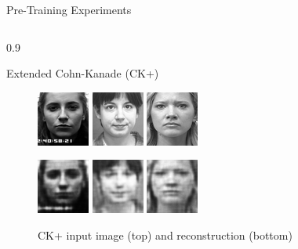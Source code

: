 \documentclass[final]{beamer}
\newlength{\onecolwid}
\newlength{\threecolwid}
\begin{document}
\begin{frame}[t]
\begin{columns}[t]
\begin{column}{\threecolwid}
\begin{alertblock}{Pre-Training Experiments}
\begin{columns}[t, totalwidth=0.9\threecolwid]
\begin{column}{0.9\onecolwid}
\begin{block}{Extended Cohn-Kanade (CK+)}
	\begin{figure}
	\centering
	\includegraphics[width=0.2\linewidth]{graphics/reconstructions/ckplus/input_00.png}
	\includegraphics[width=0.2\linewidth]{graphics/reconstructions/ckplus/input_01.png}
	\includegraphics[width=0.2\linewidth]{graphics/reconstructions/ckplus/input_02.png}

	\includegraphics[width=0.2\linewidth]{graphics/reconstructions/ckplus/reconstruction_00.png}
	\includegraphics[width=0.2\linewidth]{graphics/reconstructions/ckplus/reconstruction_01.png}
	\includegraphics[width=0.2\linewidth]{graphics/reconstructions/ckplus/reconstruction_02.png}

	\caption{CK+ input image (top) and reconstruction (bottom)}
	\end{figure}


\end{block}
\end{column}
\end{columns}
\end{alertblock}
\end{column}
\end{columns}
\end{frame}
\end{document}
